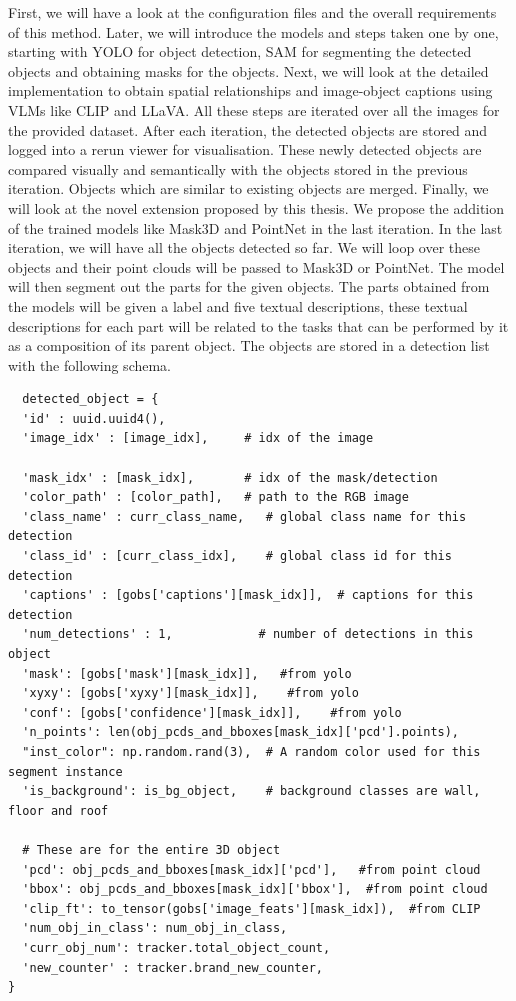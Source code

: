 First, we will have a look at the configuration files and the overall requirements of this method. Later, we will introduce the models and steps taken one by one, starting 
with YOLO for object detection, SAM for segmenting the detected objects and obtaining masks for the objects. Next, we will look at the detailed implementation to 
obtain spatial relationships and image-object captions using VLMs like CLIP and LLaVA. All these steps are iterated over all the images for the provided dataset. After each iteration, 
the detected objects are stored and logged into a rerun viewer for visualisation. These newly detected objects are compared visually and semantically with the 
objects stored in the previous iteration. Objects which are similar to existing objects are merged. Finally, we will look at the novel extension proposed by this thesis. 
We propose the addition of the trained models like Mask3D and PointNet in the last iteration. In the last iteration, we will have all the objects detected so far. We will
loop over these objects and their point clouds will be passed to Mask3D or PointNet. The model will then segment out the parts for the given objects. The parts obtained from
the models will be given a label and five textual descriptions, these textual descriptions for each part will be related to the tasks that can be performed by it as a composition
of its parent object. The objects are stored in a detection list with the following schema. 
\begin{lstlisting}
  detected_object = {
  'id' : uuid.uuid4(), 
  'image_idx' : [image_idx],     # idx of the image
  
  'mask_idx' : [mask_idx],       # idx of the mask/detection
  'color_path' : [color_path],   # path to the RGB image
  'class_name' : curr_class_name,   # global class name for this detection
  'class_id' : [curr_class_idx],    # global class id for this detection
  'captions' : [gobs['captions'][mask_idx]],  # captions for this detection
  'num_detections' : 1,            # number of detections in this object
  'mask': [gobs['mask'][mask_idx]],   #from yolo
  'xyxy': [gobs['xyxy'][mask_idx]],    #from yolo
  'conf': [gobs['confidence'][mask_idx]],    #from yolo
  'n_points': len(obj_pcds_and_bboxes[mask_idx]['pcd'].points),                       
  "inst_color": np.random.rand(3),  # A random color used for this segment instance
  'is_background': is_bg_object,    # background classes are wall, floor and roof
  
  # These are for the entire 3D object
  'pcd': obj_pcds_and_bboxes[mask_idx]['pcd'],   #from point cloud
  'bbox': obj_pcds_and_bboxes[mask_idx]['bbox'],  #from point cloud
  'clip_ft': to_tensor(gobs['image_feats'][mask_idx]),  #from CLIP
  'num_obj_in_class': num_obj_in_class,
  'curr_obj_num': tracker.total_object_count,
  'new_counter' : tracker.brand_new_counter,
}
\end{lstlisting}


